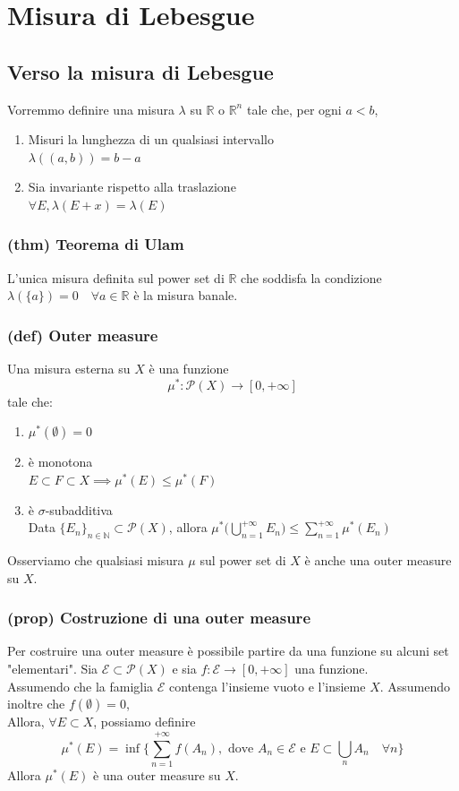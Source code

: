 \section{Misura di Lebesgue}

\subsection{Verso la misura di Lebesgue}
Vorremmo definire una misura $\lambda$ su $\mathbb R$ o $\mathbb R^n$ tale che, per ogni $a<b$,
\begin{enumerate}
    \item Misuri la lunghezza di un qualsiasi intervallo \\ $\lambda((a,b))=b-a$
    \item Sia invariante rispetto alla traslazione \\$\forall E, \lambda(E+x)=\lambda(E)$
\end{enumerate}
\subsubsection{(thm) Teorema di Ulam}
L'unica misura definita sul power set di $\mathbb R$ che soddisfa la condizione $\lambda(\{a\})=0\quad \forall a\in \mathbb R$ è la misura banale.
\subsubsection{(def) Outer measure}
Una misura esterna su $X$ è una funzione $$\mu^*:\mathcal P(X)\to [0,+\infty]$$ tale che:
\begin{enumerate}
    \item $\mu^*(\emptyset)=0$
    \item è monotona \\ $E\subset F\subset X \implies \mu^*(E)\le \mu^*(F)$
    \item è $\sigma$-subadditiva \\ Data $\{E_n\}_{n\in \mathbb N}\subset \mathcal P(X)$, allora $\mu^*\Big(\bigcup_{n=1}^{+\infty} E_n\Big)\le \sum_{n=1}^{+\infty}\mu^*(E_n)$
    
\end{enumerate}
Osserviamo che qualsiasi misura $\mu$ sul power set di $X$ è anche una outer measure su $X$.

\subsubsection{(prop) Costruzione di una outer measure}\label{(prop) Costruzione di una outer measure}
Per costruire una outer measure è possibile partire da una funzione su alcuni set "elementari".
Sia $\mathcal E \subset \mathcal P(X)$ e sia $f:\mathcal E \to [0,+\infty]$ una funzione.
\\
Assumendo che la famiglia $\mathcal E$ contenga l'insieme vuoto e l'insieme $X$. Assumendo inoltre che $f(\emptyset)=0$,\\
Allora, $\forall E\subset X$, possiamo definire
$$\mu^*(E)=\inf\Big\{\sum_{n=1}^{+\infty}f(A_n), \text{ dove } A_n\in \mathcal E \text{ e }E\subset \bigcup_n A_n\quad \forall n\Big \}$$
Allora $\mu^*(E)$ è una outer measure su $X$.
